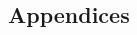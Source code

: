 


\begin{CJK*}{GBK}{song}
\frontmatter






\large{\tableofcontents}


\mainmatter





%
%
%
%
%
%

\appendix
{}
\chapter*{Appendices}
%
%
%
%
%
%
%
\printbibliography
\end{CJK*}

